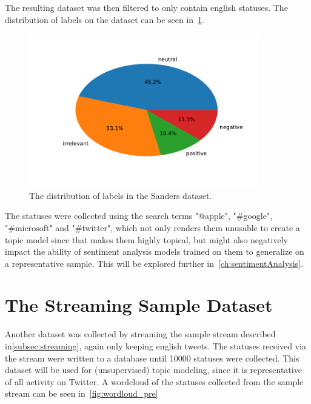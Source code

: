 The resulting dataset was then filtered to only contain english statuses.
The distribution of labels on the dataset can be seen in~\ref{fig:sanders_sentiment}.

\begin{figure}
    \centering
    \caption{The distribution of labels in the Sanders dataset.}
    \label{fig:sanders_sentiment}
    \includegraphics[width=10cm]{../figures/sanders_sentiment.pdf}
\end{figure}

The statuses were collected using the search terms "@apple", "\#google", "\#microsoft" and "\#twitter",
which not only renders them unusable to create a topic model since that makes them highly topical,
but might also negatively impact the ability of sentiment analysis models trained on them to generalize on a representative sample.
This will be explored further in~\ref{ch:sentimentAnalysis}.

\section{The Streaming Sample Dataset}
\label{sec:streamingSampleDataset}

Another dataset was collected by streaming the sample stream described in\ref{subsec:streaming},
again only keeping english tweets.
The statuses received via the stream were written to a database until 10000 statuses were collected.
This dataset will be used for (unsupervised) topic modeling, since it is representative of all activity on Twitter.
A wordcloud of the statuses collected from the sample stream can be seen in~\ref{fig:wordloud_pre}~

